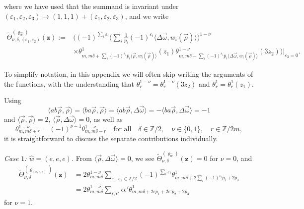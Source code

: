 \documentclass[pdftex]{sigma}
\newcommand{\ZZ}{\mathbb{Z}}
\def\bos{\varrho}
\theoremstyle{definition}
\numberwithin{equation}{section}
\begin{document}
\noindent where we have used that the summand is invariant under $(\varepsilon_1,\varepsilon_2,\varepsilon_3)\mapsto (1,1,1)+(\varepsilon_1,\varepsilon_2,\varepsilon_3)$, and we write

\begin{align*}
\tilde \Theta_{\nu,\delta,(\varepsilon_1,\varepsilon_2)}^{(\bos_{\hat{w}})}(\mathbf{z}) :={}&
\biggl((-1)^{\sum_{i}\varepsilon_i}
{\bigg(\sum_{i}\tfrac{1}{p_i} (-1)^{\varepsilon_i} \langle \Delta\vec\omega, w_i(\vec{\rho})\rangle\bigg)^{1-\nu}} \\
&\times\theta^1_{m,m\delta + \sum_{i} (-1)^{\varepsilon_i} \bar{p}_i \langle\vec{\rho}, w_i(\vec{\rho})\rangle} ({z_1}) \theta^{1-\nu}_{m,m\delta - \sum_{i} (-1)^{\varepsilon_i} \bar{p}_i \langle \Delta\vec\omega, w_i(\vec{\rho}) \rangle}({3z_2})\Bigr)\lvert_{\varepsilon_3=0}.
\end{align*}

To simplify notation, in this appendix we will often skip writing the arguments of the functions, with the understanding that $ \theta^{1-\nu}_r = \theta^{1-\nu}_r\left({3z_2}\right)$ and $\theta^1_r=\theta^1_r\left({z_1}\right)$.

Using
\[
\langle ab\vec\rho,\vec\rho \rangle= \langle ba\vec\rho,\vec\rho \rangle = \langle ab\vec\rho,\Delta\vec\omega \rangle
= -\langle ba\vec\rho,\Delta\vec\omega \rangle =-1
\]
and $\langle \vec\rho,\vec\rho \rangle = 2$, $\langle \vec\rho,\Delta\vec\omega \rangle =0$, as well as
\[
\theta^{1-\nu}_{m,m\delta+r}= (-1)^{\nu-1}\theta^{1-\nu}_{m,m\delta-r}\quad
\text{for all}\quad\delta\in \ZZ/2, \quad\nu\in \{0,1\},\quad r\in \ZZ/2m,
\]
it is straightforward to discuss the separate contributions individually.

{\em Case $1$: $\hat w=(e,e,e)$.}
From $\langle \vec\rho,\Delta\vec\omega \rangle =0$,
we see $ \tilde \Theta_{\nu,\delta}^{(\bos_{\hat{w}})}(\mathbf{z})=0$ for $\nu=0$, and
\begin{align*}
\tilde\Theta_{\nu,\delta}^{(\bos_{(e,e,e)})}(\mathbf{z})&={2}\theta^{1-\nu}_{m,m\delta } \sum_{\varepsilon_1,\varepsilon_2\in \ZZ/2} (-1)^{\sum_{i}\varepsilon_i}
\theta^1_{m,m\delta + 2 \sum_{i} {(-1)^{\varepsilon_i}\bar{p}_i} + 2\bar p_3}
\\
&={2} \theta^{1-\nu}_{m,m\delta } \sum_{\epsilon, \epsilon'}\epsilon\epsilon'
\theta^1_{m,m\delta + 2 \epsilon \bar p_1 + 2 \epsilon' \bar p_2 + 2\bar p_3}
\end{align*}
for $\nu=1$.
\end{document}
